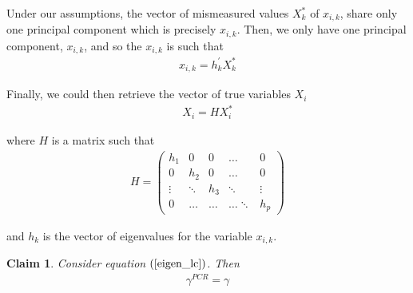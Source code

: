 \documentclass[10pt]{article}
\makeatletter
\newtheorem{claim}{Claim}
\renewenvironment{proof}[1][\proofname] {\par\pushQED{\qed}\normalfont\topsep6\p@\@plus6\p@\relax\trivlist\item[\hskip\labelsep\bfseries#1\@addpunct{.}]\ignorespaces}{\popQED\endtrivlist\@endpefalse}
\makeatother
\begin{document}
        \begin{proof}
        Under our assumptions, the vector of mismeasured values $X^*_k$ of $x_{i,k}$, share only one principal component which is precisely $x_{i,k}$. Then, we only have one principal component, $x_{i,k}$, and so the $x_{i,k}$ is such that
                \begin{align*}
                    x_{i,k}=h_{k}^{\prime} X^*_k
                \end{align*}
                
                Finally, we could then retrieve the vector of true variables $X_i$
                \begin{align*}
                    X_i=HX^*_i
                \end{align*}
                
                where $H$ is a matrix such that
                \begin{align*}
                    H=\left(\begin{array}{ccccc}
                h_1 & 0 & 0 & \dots & 0 \\
                0 & h_2 & 0 & \dots & 0 \\
                \vdots & \ddots & h_3 & \ddots & \vdots \\
                0 & \dots & \dots & \dots \ddots & h_p
                \end{array}\right)
                \end{align*}
                
                and $h_k$ is the vector of eigenvalues for the variable $x_{i,k}$.
        \end{proof}
        
        \begin{claim}
        Consider equation $(\ref{eigen_lc})$. Then
        \begin{align*}
        {\gamma}^{PCR} = \gamma
        \end{align*}
        \end{claim}
\end{document}
